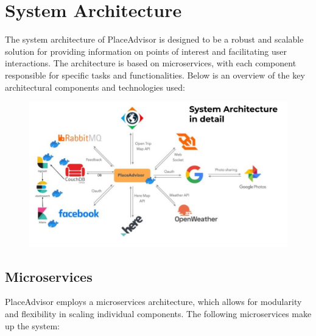 \documentclass[../main.tex]{subfiles}
\begin{document}
\section{System Architecture}\label{sec:systemarchitecture}

The system architecture of PlaceAdvisor is designed to be a robust and scalable solution for providing information on points of interest and facilitating user interactions. The architecture is based on microservices, with each component responsible for specific tasks and functionalities. Below is an overview of the key architectural components and technologies used:

\begin{figure}[H]
	\centering
	\label{fig:pngegg}
	\includegraphics[width=1\linewidth]{../figures/System Architecture.jpg}
  \end{figure}

\subsection{Microservices}

PlaceAdvisor employs a microservices architecture, which allows for modularity and flexibility in scaling individual components. The following microservices make up the system:
\end{document}
